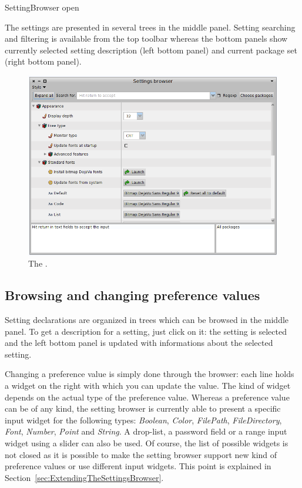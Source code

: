\documentclass[a4paper,10pt,twoside]{book}
\begin{document}
\begin{code}{}
SettingBrowser open
\end{code}
The settings are presented in several trees in the middle panel. Setting searching and filtering is available from the top toolbar whereas the bottom panels show currently selected setting description (left bottom panel) and current package set (right bottom panel). 
\begin{figure}[tbh]
\begin{center}
\includegraphics[scale=0.3]{SettingBrowser}
\caption{The \setbrowser.}
\end{center}
\end{figure}

\subsection{Browsing and changing preference values}
\label{sec:browsing-settings}
Setting declarations are organized in trees which can be browsed in the middle panel. To get a description for a setting, just click on it: the setting is selected and the left bottom panel is updated with informations about the selected setting. 

Changing a  preference value is simply done through the browser: each line holds a widget on the right with which you can update the value. The kind of widget depends on the actual type of the preference value. Whereas a preference value can be of any kind, the setting browser is currently able to present a specific input widget for the following types: \textit{Boolean}, \textit{Color}, \textit{FilePath}, \textit{FileDirectory}, \textit{Font}, \textit{Number}, \textit{Point} and \textit{String}. A drop-list, a password field or a range input widget using a slider can also be used. Of course, the list of possible widgets is not closed as it is possible to make the setting browser support new kind of preference values or use different input widgets. This point is explained in Section~\ref{sec:ExtendingTheSettingsBrowser}.
\end{document}
